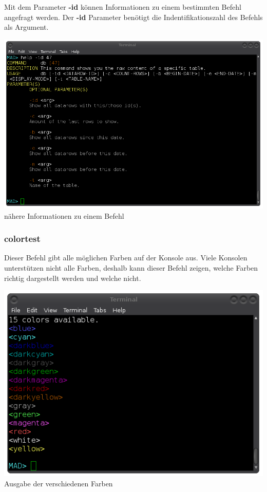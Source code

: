 \documentclass[12pt,a4paper]{report}
\begin{document}
\begin{onehalfspace}
Mit dem Parameter \textbf{-id} können Informationen zu einem bestimmten Befehl angefragt werden. Der \textbf{-id} Parameter benötigt die Indentifikationszahl des Befehls als Argument.

\begin{center}
\includegraphics[scale=0.5]{img/cli_help_id.png}\\
nähere Informationen zu einem Befehl
\end{center}

\subsubsection{colortest}

Dieser Befehl gibt alle möglichen Farben auf der Konsole aus. Viele Konsolen unterstützen nicht alle Farben, deshalb kann dieser Befehl zeigen, welche Farben richtig dargestellt werden und welche nicht.

\begin{center}
\includegraphics[scale=0.5]{img/cli_colortest.png}\\
Ausgabe der verschiedenen Farben
\end{center}


\end{onehalfspace}
\end{document}
